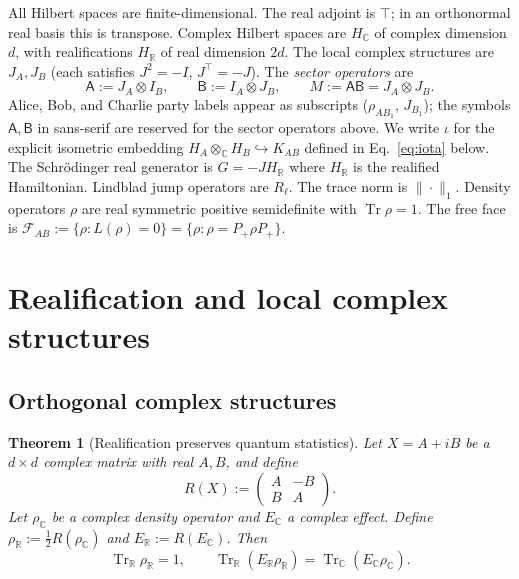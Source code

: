 \documentclass[a4paper,onecolumn,noarxiv]{quantumarticle}
\theoremstyle{plain}
\newtheorem{theorem}{Theorem}
\theoremstyle{definition}
\theoremstyle{remark}
\newcommand{\R}{\mathbb{R}}
\newcommand{\C}{\mathbb{C}}
\newcommand{\HC}{H_{\C}}
\newcommand{\HR}{H_{\R}}
\newcommand{\KAB}{K_{AB}}
\newcommand{\Pplus}{P_{+}}
\newcommand{\Aop}{\mathsf{A}}
\newcommand{\Bop}{\mathsf{B}}
\newcommand{\Mop}{M}
\newcommand{\FAB}{\mathcal{F}_{AB}}
\newcommand{\Tr}{\operatorname{Tr}}
\newcommand{\Lleak}{L}
\begin{document}
All Hilbert spaces are finite-dimensional. The real adjoint is $\top$; in an
orthonormal real basis this is transpose. Complex Hilbert spaces are $\HC$ of
complex dimension $d$, with realifications $\HR$ of real dimension $2d$. The local
complex structures are $J_A, J_B$ (each satisfies $J^2=-I$, $J^\top=-J$). The
\emph{sector operators} are
\begin{equation}
  \Aop := J_A\otimes I_B,\qquad \Bop := I_A\otimes J_B,\qquad
  \Mop := \Aop\Bop = J_A\otimes J_B.
  \label{eq:sectorops}
\end{equation}
Alice, Bob, and Charlie party labels appear as subscripts ($\rho_{AB_1}$, $J_{B_1}$);
the symbols $\Aop, \Bop$ in sans-serif are reserved for the sector operators above.
We write $\iota$ for the explicit isometric embedding
$H_A\otimes_\C H_B\hookrightarrow\KAB$ defined in Eq.~\eqref{eq:iota} below. The
Schr\"{o}dinger real generator is $G=-JH_\R$ where $H_\R$ is the realified
Hamiltonian. Lindblad jump operators are $R_\ell$. The trace norm is $\|\cdot\|_1$.
Density operators $\rho$ are real symmetric positive semidefinite with $\Tr\rho=1$.
The free face is $\FAB := \{\rho : \Lleak(\rho)=0\} = \{\rho : \rho=\Pplus\rho\Pplus\}$.

\section{Realification and local complex structures}
\label{sec:realification}

\subsection{Orthogonal complex structures}

\begin{theorem}[Realification preserves quantum statistics]
\label{thm:realification}
Let $X=A+iB$ be a $d\times d$ complex matrix with real $A,B$, and define
\begin{equation}
  R(X) := \begin{pmatrix} A & -B \\ B & A \end{pmatrix}.
  \label{eq:R}
\end{equation}
Let $\rho_\C$ be a complex density operator and $E_\C$ a complex effect. Define
$\rho_\R := \tfrac{1}{2}R(\rho_\C)$ and $E_\R := R(E_\C)$. Then
\begin{equation}
  \Tr_\R\rho_\R = 1,\qquad \Tr_\R(E_\R\rho_\R) = \Tr_\C(E_\C\rho_\C).
\end{equation}
\end{theorem}
\end{document}
